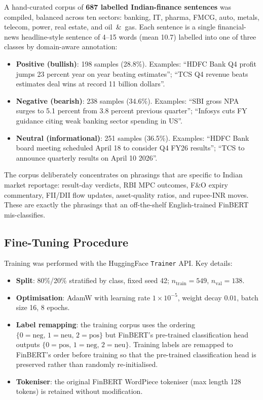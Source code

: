 A hand-curated corpus of \textbf{687 labelled Indian-finance sentences} was compiled, balanced across ten sectors: banking, IT, pharma, FMCG, auto, metals, telecom, power, real estate, and oil~\&~gas. Each sentence is a single financial-news headline-style sentence of 4--15 words (mean 10.7) labelled into one of three classes by domain-aware annotation:
\begin{itemize}\itemsep1pt
    \item \textbf{Positive (bullish)}: 198 samples (28.8\%). Examples: \enquote{HDFC Bank Q4 profit jumps 23 percent year on year beating estimates}; \enquote{TCS Q4 revenue beats estimates deal wins at record 11 billion dollars}.
    \item \textbf{Negative (bearish)}: 238 samples (34.6\%). Examples: \enquote{SBI gross NPA surges to 5.1 percent from 3.8 percent previous quarter}; \enquote{Infosys cuts FY guidance citing weak banking sector spending in US}.
    \item \textbf{Neutral (informational)}: 251 samples (36.5\%). Examples: \enquote{HDFC Bank board meeting scheduled April 18 to consider Q4 FY26 results}; \enquote{TCS to announce quarterly results on April 10 2026}.
\end{itemize}

The corpus deliberately concentrates on phrasings that are specific to Indian market reportage: result-day verdicts, RBI MPC outcomes, F\&O expiry commentary, FII/DII flow updates, asset-quality ratios, and rupee-INR moves. These are exactly the phrasings that an off-the-shelf English-trained FinBERT mis-classifies.

\subsection{Fine-Tuning Procedure}

Training was performed with the HuggingFace \texttt{Trainer} API. Key details:

\begin{itemize}\itemsep1pt
    \item \textbf{Split}: 80\%/20\% stratified by class, fixed seed 42; $n_{\text{train}}=549$, $n_{\text{val}}=138$.
    \item \textbf{Optimisation}: AdamW with learning rate $1\times10^{-5}$, weight decay $0.01$, batch size 16, 8 epochs.
    \item \textbf{Label remapping}: the training corpus uses the ordering $\{0\!=\!\text{neg},\,1\!=\!\text{neu},\,2\!=\!\text{pos}\}$ but FinBERT's pre-trained classification head outputs $\{0\!=\!\text{pos},\,1\!=\!\text{neg},\,2\!=\!\text{neu}\}$. Training labels are remapped to FinBERT's order before training so that the pre-trained classification head is preserved rather than randomly re-initialised.
    \item \textbf{Tokeniser}: the original FinBERT WordPiece tokeniser (max length 128 tokens) is retained without modification.
\end{itemize}

